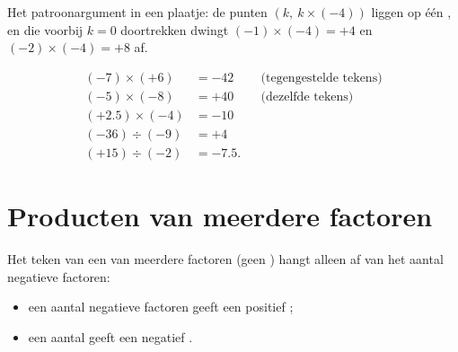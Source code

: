 \begin{omfigure}

{\small Het patroonargument in een plaatje: de punten $(k,\ k \times (-4))$ liggen op
één , en die  voorbij $k = 0$ doortrekken dwingt
$(-1)\times(-4) = +4$ en $(-2)\times(-4) = +8$ af.}
\end{omfigure}

\begin{example}\label{ex:g8:negprod:products}
\begin{align*}
(-7) \times (+6) &= -42 && \text{(tegengestelde tekens)} \\
(-5) \times (-8) &= +40 && \text{(dezelfde tekens)} \\
(+2.5) \times (-4) &= -10 \\
(-36) \div (-9) &= +4 \\
(+15) \div (-2) &= -7.5 .
\end{align*}
\end{example}

\section{Producten van meerdere factoren}

\begin{proposition}\label{prop:g8:negprod:many}
Het teken van een  van meerdere factoren (geen ) hangt alleen af van het
aantal negatieve factoren:
\begin{itemize}
  \item een \emph{} aantal negatieve factoren geeft een positief ;
  \item een \emph{} aantal geeft een negatief .
\end{itemize}
\end{proposition}

